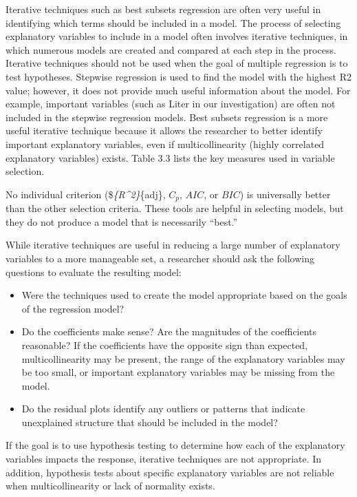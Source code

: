 \documentclass[
]{report}
\providecommand{\tightlist}{%
  \setlength{\itemsep}{0pt}\setlength{\parskip}{0pt}}
\begin{document}
Iterative techniques such as best subsets regression are often very useful in identifying which terms should be included in a model. The process of selecting explanatory variables to include in a model often involves iterative techniques, in which numerous models are created and compared at each step in the process. Iterative techniques should not be used when the goal of multiple regression is to test hypotheses. Stepwise regression is used to find the model with the highest R2 value; however, it does not provide much useful information about the model. For example, important variables (such as Liter in our investigation) are often not included in the stepwise regression models. Best subsets regression is a more useful iterative technique
because it allows the researcher to better identify important explanatory variables, even if multicollinearity (highly correlated explanatory variables) exists. Table 3.3 lists the key measures used in variable selection.

No individual criterion (\$\emph{\{R\^{}2\}}\{adj\}, \(C_p\), \(AIC\), or \(BIC\)) is universally better than the other selection criteria. These tools are helpful in selecting models, but they do not produce a model that is necessarily ``best.''

While iterative techniques are useful in reducing a large number of explanatory variables to a more manageable set, a researcher should ask the following questions to evaluate the resulting model:

\begin{itemize}
\tightlist
\item
  Were the techniques used to create the model appropriate based on the goals of the regression model?
\item
  Do the coefficients make sense? Are the magnitudes of the coefficients reasonable? If the coefficients have the opposite sign than expected, multicollinearity may be present, the range of the explanatory variables may be too small, or important explanatory variables may be missing from the model.
\item
  Do the residual plots identify any outliers or patterns that indicate unexplained structure that should be included in the model?
\end{itemize}

If the goal is to use hypothesis testing to determine how each of the explanatory variables impacts the response, iterative techniques are not appropriate. In addition, hypothesis tests about specific explanatory variables are not reliable when multicollinearity or lack of normality exists.
\end{document}
